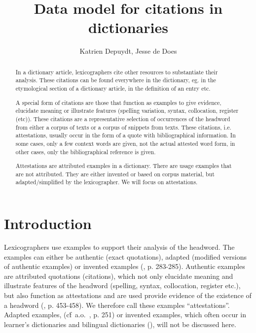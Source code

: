 \documentclass[10pt]{article}
\title{Data model for citations in dictionaries}
\author{Katrien Depuydt, Jesse de Does}
\date{}
\begin{document}
\maketitle
\par



\begin{abstract}
    

 In a dictionary article, lexicographers cite other resources to substantiate their analysis. These citations can be found everywhere in the dictionary, eg. in the etymological section of a dictionary article, in the definition of an entry etc.

 A special form of citations are those that function as examples to give evidence, elucidate meaning or illustrate features (spelling variation, syntax, collocation, register (etc)).  These citations are a representative selection of occurrences of the headword from either a corpus of texts or a corpus of snippets from texts. These citations, i.e. attestations, usually occur in the form of a quote with bibliographical information. In some cases, only a few context words are given, not the actual attested word form, in other cases, only the bibliographical reference is given.
 
 
 Attestations are attributed examples in a dictionary. There are usage examples that are not attributed. They are either invented or based on corpus material, but adapted/simplified by the lexicographer. We 
 will focus on attestations.

\end{abstract}
\section{Introduction}
Lexicographers use examples  to support their analysis of the headword. The examples can either be authentic (exact quotations), adapted (modified versions of authentic examples) or invented examples (\cite{Svensen}, p. 283-285). Authentic examples are attributed quotations (citations), which not only elucidate meaning and illustrate features of the headword (spelling, syntax, collocation, register etc.), but also function as attestations and are used provide evidence of the existence of a headword (\cite{AtkinsRundell}, p. 453-458). We therefore call these examples ``attestations''. Adapted examples, (cf\.~a.o.~\cite{ColloCaid}, p. 251) or invented examples, which often occur in learner's dictionaries and bilingual dictionaries (\cite{Kernerman}), will not be discussed here.  \par
\end{document}
